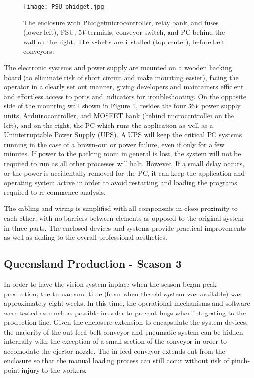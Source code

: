 \documentclass[fleqn,twoside]{article}
\begin{document}
\begin{figure}[h]
	\centering
	\texttt{[image: PSU\_phidget.jpg]}
	\caption{The enclosure with Phidget\texttrademark microcontroller, relay bank, and fuses (lower left), PSU, $5V$ termials, conveyor switch, and PC behind the wall on the right. The v-belts are installed (top center), before belt conveyors.}
	\label{fig:PSU_phidget}
\end{figure}%


The electronic systems and power supply are mounted on a wooden backing board (to eliminate risk of short circuit and make mounting easier), facing the operator in a clearly set out manner, giving developers and maintainers efficient and effortless access to ports and indicators for troubleshooting. On the opposite side of the mounting wall shown in Figure \ref{fig:PSU_phidget}, resides the four $36V$ power supply units, Arduino\texttrademark controller, and MOSFET bank (behind microcontroller on the left), and on the right, the PC which runs the application as well as a Uninterruptable Power Supply (UPS). A UPS will keep the critical PC systems running in the case of a brown-out or power failure, even if only for a few minutes. If power to the packing room in general is lost, the system will not be required to run as all other processes will halt. However, If a small delay occurs, or the power is accidentally removed for the PC, it can keep the application and operating system active in order to avoid restarting and loading the programs required to re-commence analysis.

The cabling and wiring is simplified with all components in close proximity to each other, with no barriers between elements as opposed to the original system in three parts. The enclosed devices and systems provide practical improvements as well as adding to the overall professional aesthetics. 



\subsection{Queensland Production - Season 3}


In order to have the vision system inplace when the season began peak production, the turnaround time (from when the old system was available) was approximately eight weeks. In this time, the operational mechanisms and software were tested as much as possible in order to prevent bugs when integrating to the production line. Given the enclosure extension to encapsulate the system devices, the majority of the  out-feed belt conveyor and pneumatic system can be hidden internally with the exception of a small section of the conveyor in order to accomodate the ejector nozzle. The in-feed conveyor extends out from the enclosure so that the manual loading process can still occur without risk of pinch-point injury to the workers.
\end{document}
